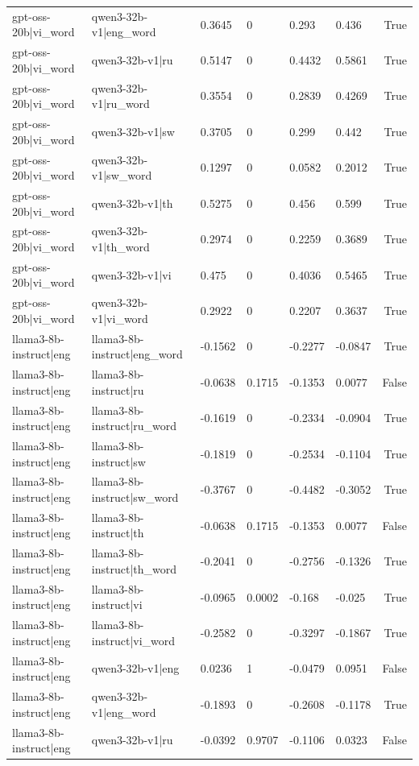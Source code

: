 \begin{table}
\begin{tabular}{llllllr}
gpt-oss-20b|vi_word & qwen3-32b-v1|eng_word & 0.3645 & 0 & 0.293 & 0.436 & True \\
gpt-oss-20b|vi_word & qwen3-32b-v1|ru & 0.5147 & 0 & 0.4432 & 0.5861 & True \\
gpt-oss-20b|vi_word & qwen3-32b-v1|ru_word & 0.3554 & 0 & 0.2839 & 0.4269 & True \\
gpt-oss-20b|vi_word & qwen3-32b-v1|sw & 0.3705 & 0 & 0.299 & 0.442 & True \\
gpt-oss-20b|vi_word & qwen3-32b-v1|sw_word & 0.1297 & 0 & 0.0582 & 0.2012 & True \\
gpt-oss-20b|vi_word & qwen3-32b-v1|th & 0.5275 & 0 & 0.456 & 0.599 & True \\
gpt-oss-20b|vi_word & qwen3-32b-v1|th_word & 0.2974 & 0 & 0.2259 & 0.3689 & True \\
gpt-oss-20b|vi_word & qwen3-32b-v1|vi & 0.475 & 0 & 0.4036 & 0.5465 & True \\
gpt-oss-20b|vi_word & qwen3-32b-v1|vi_word & 0.2922 & 0 & 0.2207 & 0.3637 & True \\
llama3-8b-instruct|eng & llama3-8b-instruct|eng_word & -0.1562 & 0 & -0.2277 & -0.0847 & True \\
llama3-8b-instruct|eng & llama3-8b-instruct|ru & -0.0638 & 0.1715 & -0.1353 & 0.0077 & False \\
llama3-8b-instruct|eng & llama3-8b-instruct|ru_word & -0.1619 & 0 & -0.2334 & -0.0904 & True \\
llama3-8b-instruct|eng & llama3-8b-instruct|sw & -0.1819 & 0 & -0.2534 & -0.1104 & True \\
llama3-8b-instruct|eng & llama3-8b-instruct|sw_word & -0.3767 & 0 & -0.4482 & -0.3052 & True \\
llama3-8b-instruct|eng & llama3-8b-instruct|th & -0.0638 & 0.1715 & -0.1353 & 0.0077 & False \\
llama3-8b-instruct|eng & llama3-8b-instruct|th_word & -0.2041 & 0 & -0.2756 & -0.1326 & True \\
llama3-8b-instruct|eng & llama3-8b-instruct|vi & -0.0965 & 0.0002 & -0.168 & -0.025 & True \\
llama3-8b-instruct|eng & llama3-8b-instruct|vi_word & -0.2582 & 0 & -0.3297 & -0.1867 & True \\
llama3-8b-instruct|eng & qwen3-32b-v1|eng & 0.0236 & 1 & -0.0479 & 0.0951 & False \\
llama3-8b-instruct|eng & qwen3-32b-v1|eng_word & -0.1893 & 0 & -0.2608 & -0.1178 & True \\
llama3-8b-instruct|eng & qwen3-32b-v1|ru & -0.0392 & 0.9707 & -0.1106 & 0.0323 & False \\

\end{tabular}
\end{table}
